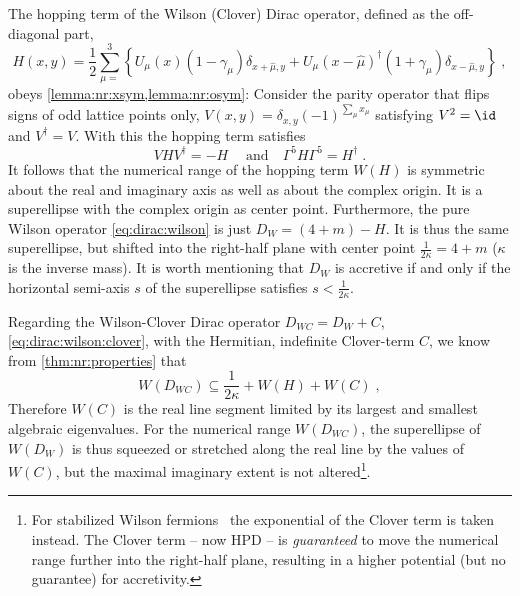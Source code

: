 The hopping term of the Wilson (Clover) Dirac operator, defined as the off-diagonal part,
\begin{equation}
H(x,y) = \frac{1}{2} \sum_{\mu=}^{3}
\left\{
      U_{\mu}(x) (1 - \gamma_{\mu}) \delta_{x+\hat{\mu}, y}
    + U_{\mu}(x - \hat{\mu})^{\dagger} (1 + \gamma_{\mu}) \delta_{x-\hat{\mu}, y}
\right\} \;,
\end{equation}
obeys \cref{lemma:nr:xsym,lemma:nr:osym}:
Consider the parity operator that flips signs of odd lattice points only, $V(x,y) = \delta_{x,y} (-1)^{\sum_{\mu} x_{\mu}}$ satisfying $V^{2} = \id$ and $V^{\dagger} = V$.
With this the hopping term satisfies
\begin{equation}
V H V^{\dagger} = -H \;
\quad
\text{and}
\quad
\Gamma^{5} H \Gamma^{5} = H^{\dagger} \;.
\end{equation}
It follows that the numerical range of the hopping term $W(H)$ is symmetric about the real and imaginary axis as well as about the complex origin.
It is a superellipse with the complex origin as center point.
Furthermore, the pure Wilson operator \cref{eq:dirac:wilson} is just $D_W = (4+m) - H$.
It is thus the same superellipse, but shifted into the right-half plane with center point $\frac{1}{2 \kappa} = 4+m$ ($\kappa$ is the inverse mass).
It is worth mentioning that $D_W$ is accretive if and only if the horizontal semi-axis $s$ of the superellipse satisfies $s < \frac{1}{2 \kappa}$.

Regarding the Wilson-Clover Dirac operator $D_{WC} = D_W + C$, \cref{eq:dirac:wilson:clover}, with the Hermitian,  indefinite Clover-term $C$, we know from \cref{thm:nr:properties} that
\begin{equation}
W(D_{WC}) \subseteq  \frac{1}{2 \kappa} + W(H) + W(C) \;,
\end{equation}
Therefore $W(C)$ is the real line segment limited by its largest and smallest algebraic eigenvalues.
For the numerical range $W(D_{WC})$, the superellipse of $W(D_{W})$ is thus squeezed or stretched along the real line by the values of $W(C)$, but the maximal imaginary extent is not altered\footnote{For stabilized Wilson fermions~\cite{Francis:2019muy} the exponential of the Clover term is taken instead. The Clover term -- now HPD -- is \emph{guaranteed} to move the numerical range further into the right-half plane, resulting in a higher potential (but no guarantee) for accretivity.}.

